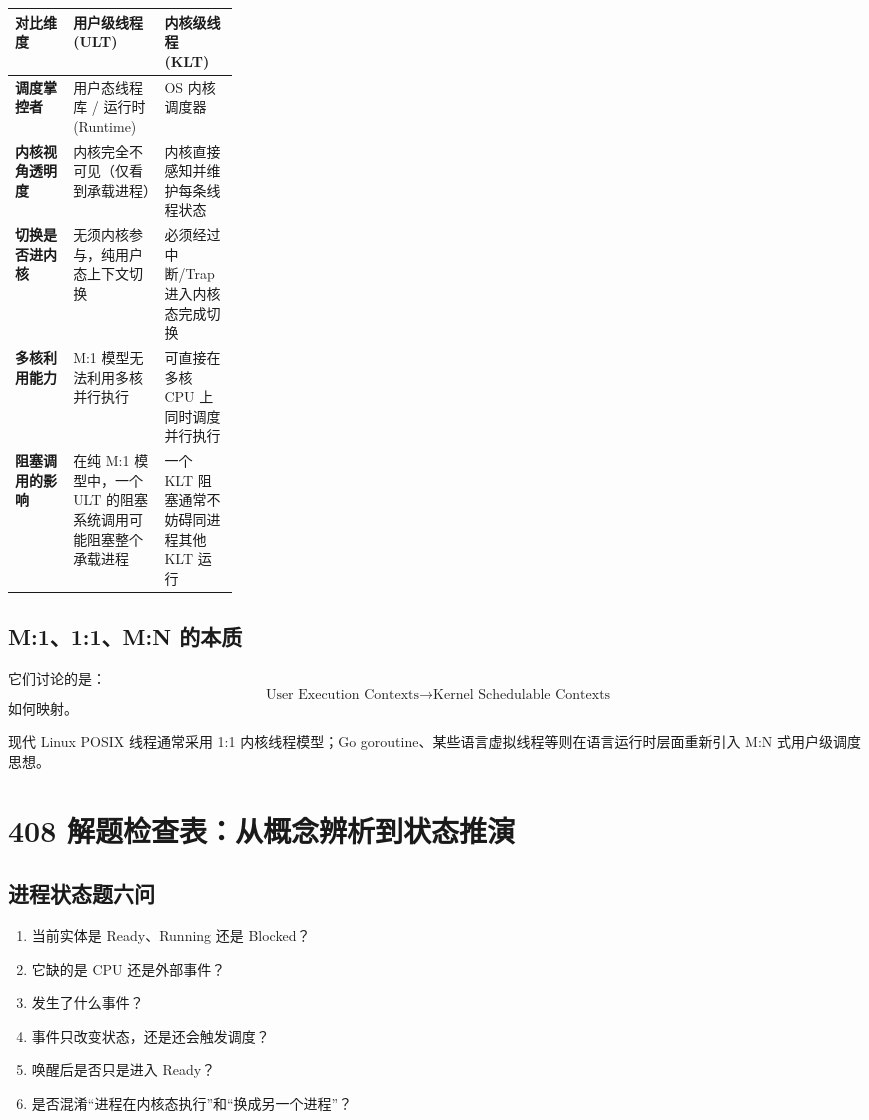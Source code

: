 \documentclass[11pt,a4paper]{ctexart}
\begin{document}
\begingroup
\small
\renewcommand{\arraystretch}{1.25}
\setlength{\tabcolsep}{6pt}
\begin{tabularx}{\linewidth}{>{\bfseries}p{0.26\linewidth} X X}
\toprule
对比维度 & 用户级线程 (ULT) & 内核级线程 (KLT)\\
\midrule
调度掌控者 & 用户态线程库 / 运行时 (Runtime) & OS 内核调度器\\
内核视角透明度 & 内核完全不可见（仅看到承载进程） & 内核直接感知并维护每条线程状态\\
切换是否进内核 & 无须内核参与，纯用户态上下文切换 & 必须经过中断/Trap 进入内核态完成切换\\
多核利用能力 & M:1 模型无法利用多核并行执行 & 可直接在多核 CPU 上同时调度并行执行\\
阻塞调用的影响 & 在纯 M:1 模型中，一个 ULT 的阻塞系统调用可能阻塞整个承载进程 & 一个 KLT 阻塞通常不妨碍同进程其他 KLT 运行\\
\bottomrule
\end{tabularx}
\endgroup

\subsection{M:1、1:1、M:N 的本质}

它们讨论的是：
\[
\boxed{\text{User Execution Contexts}\rightarrow\text{Kernel Schedulable Contexts}}
\]
如何映射。

现代 Linux POSIX 线程通常采用 1:1 内核线程模型；Go goroutine、某些语言虚拟线程等则在语言运行时层面重新引入 M:N 式用户级调度思想。

\section{408 解题检查表：从概念辨析到状态推演}

\subsection{进程状态题六问}
\begin{enumerate}
\item 当前实体是 Ready、Running 还是 Blocked？
\item 它缺的是 CPU 还是外部事件？
\item 发生了什么事件？
\item 事件只改变状态，还是还会触发调度？
\item 唤醒后是否只是进入 Ready？
\item 是否混淆“进程在内核态执行”和“换成另一个进程”？
\end{enumerate}
\end{document}
